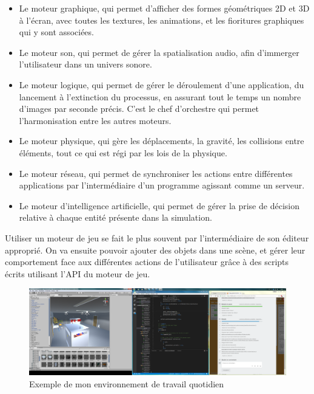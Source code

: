 \documentclass[a4paper]{article}
\begin{document}
    \begin{itemize}

        \item Le moteur graphique, qui permet d'afficher des formes géométriques 2D et 3D à l'écran, avec toutes les textures, les animations, et les fioritures graphiques qui y sont associées. \\

        \item Le moteur son, qui permet de gérer la spatialisation audio, afin d'immerger l'utilisateur dans un univers sonore. \\
 
        \item Le moteur logique, qui permet de gérer le déroulement d'une application, du lancement à l'extinction du processus, en assurant tout le temps un nombre d'images par seconde précis. C'est le chef d'orchestre qui permet l'harmonisation entre les autres moteurs. \\

        \item Le moteur physique, qui gère les déplacements, la gravité, les collisions entre éléments, tout ce qui est régi par les lois de la physique. \\

        \item Le moteur réseau, qui permet de synchroniser les actions entre différentes applications par l'intermédiaire d'un programme agissant comme un serveur. \\

        \item Le moteur d'intelligence artificielle, qui permet de gérer la prise de décision relative à chaque entité présente dans la simulation. \\
    \end{itemize}

    Utiliser un moteur de jeu se fait le plus souvent par l'intermédiaire de son éditeur approprié. On va ensuite pouvoir ajouter des objets dans une scène, et gérer leur comportement face aux différentes actions de l'utilisateur grâce à des scripts écrits utilisant l'API du moteur de jeu. \\

    \begin{figure}[H]
        \centering
        \includegraphics[scale=0.2]{img/EverydayWorkflow}
        \caption{Exemple de mon environnement de travail quotidien}
    \end{figure}
\end{document}
